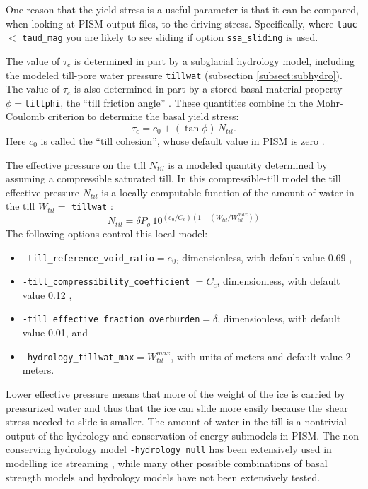 One reason that the yield stress is a useful parameter is that it can be compared, when looking at PISM output files, to the driving stress.  Specifically, where \texttt{tauc} $<$ \texttt{taud_mag} you are likely to see sliding if option \texttt{ssa_sliding} is used.

The value of $\tau_c$ is determined in part by a subglacial hydrology model, including the modeled till-pore water pressure \texttt{tillwat} (subsection \ref{subsect:subhydro}).  The value of $\tau_c$ is also determined in part by a stored basal material property $\phi=$\texttt{tillphi}, the ``till friction angle'' \cite{Paterson}.  These quantities combine in the Mohr-Coulomb criterion \cite[Chapter 8]{Paterson} to determine the basal yield stress:
\begin{equation}
   \tau_c = c_{0} + (\tan\phi)\,N_{til}.  \label{eq:mohrcoulomb}
\end{equation}
Here $c_0$ is called the ``till cohesion'', whose default value in PISM is zero \cite[formula (2.4)]{SchoofStream}.

The effective pressure on the till $N_{til}$ is a modeled quantity determined by assuming a compressible saturated till.  In this compressible-till model the till effective pressure $N_{til}$ is a locally-computable function of the amount of water in the till $W_{til} =$ \texttt{tillwat} \cite{BuelervanPeltDRAFT}:
\begin{equation}
N_{til} = \delta P_o \, 10^{(e_0/C_c) \left(1 - (W_{til}/W_{til}^{max})\right)}  \label{eq:computeNtil}
\end{equation}
The following options control this local model:\begin{itemize}
\item \texttt{-till_reference_void_ratio}$= e_0$, dimensionless, with default value 0.69 \cite{Tulaczyketal2000b},
\item \texttt{-till_compressibility_coefficient} $= C_c$, dimensionless, with default value 0.12 \cite{Tulaczyketal2000b},
\item \texttt{-till_effective_fraction_overburden}$= \delta$, dimensionless, with default value 0.01, and
\item \texttt{-hydrology_tillwat_max}$= W_{til}^{max}$, with units of meters and default value 2 meters.
\end{itemize}

Lower effective pressure means that more of the weight of the ice is carried by pressurized water and thus that the ice can slide more easily because the shear stress needed to slide is smaller.  The amount of water in the till is a nontrivial output of the hydrology and conservation-of-energy submodels in PISM.  The non-conserving hydrology model \texttt{-hydrology null} has been extensively used in modelling ice streaming \cite{BBssasliding,BKAJS,Winkelmannetal2011}, while many other possible combinations of basal strength models and hydrology models have not been extensively tested.

